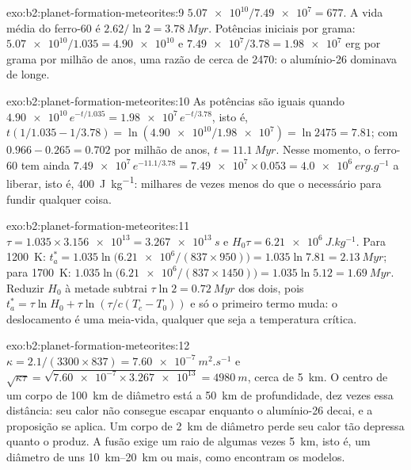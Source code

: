 \begin{solution}{exo:b2:planet-formation-meteorites:9}
$\num{5.07e10}/\num{7.49e7} = 677$. A vida média do ferro-60 é
$2.62/\ln2 = \qty{3.78}{Myr}$. Potências iniciais por grama:
$\num{5.07e10}/1.035 = \num{4.90e10}$ e $\num{7.49e7}/3.78 = \num{1.98e7}$ erg por
grama por milhão de anos, uma razão de cerca de \num{2470}: o alumínio-26 dominava de longe.
\end{solution}

\begin{solution}{exo:b2:planet-formation-meteorites:10}
As potências são iguais quando $\num{4.90e10}\,e^{-t/1.035} = \num{1.98e7}\,e^{-t/3.78}$,
isto é, $t(1/1.035 - 1/3.78) = \ln(\num{4.90e10}/\num{1.98e7}) = \ln 2475 = 7.81$;
com $0.966 - 0.265 = 0.702$ por milhão de anos, $t = \qty{11.1}{Myr}$. Nesse momento, o
ferro-60 tem ainda $\num{7.49e7}\,e^{-11.1/3.78} = \num{7.49e7}\times0.053 =
\qty{4.0e6}{erg.g^{-1}}$ a liberar, isto é, \qty{400}{J.kg^{-1}}: milhares de vezes
menos do que o necessário para fundir qualquer coisa.
\end{solution}

\begin{solution}{exo:b2:planet-formation-meteorites:11}
$\tau = 1.035\times\num{3.156e13} = \qty{3.267e13}{s}$ e
$H_0\tau = \qty{6.21e6}{J.kg^{-1}}$. Para \qty{1200}{K}:
$t_a^* = 1.035\ln\bigl(\num{6.21e6}/(837\times950)\bigr) = 1.035\ln7.81 =
\qty{2.13}{Myr}$; para \qty{1700}{K}: $1.035\ln\bigl(\num{6.21e6}/(837\times1450)\bigr)
= 1.035\ln5.12 = \qty{1.69}{Myr}$. Reduzir $H_0$ à metade subtrai $\tau\ln2 =
\qty{0.72}{Myr}$ dos dois, pois $t_a^* = \tau\ln H_0 + \tau\ln(\tau/c(T_c -
T_0))$ e só o primeiro termo muda: o deslocamento é uma meia-vida, qualquer que seja a
temperatura crítica.
\end{solution}

\begin{solution}{exo:b2:planet-formation-meteorites:12}
$\kappa = 2.1/(3300\times837) = \qty{7.60e-7}{m^2.s^{-1}}$ e
$\sqrt{\kappa\tau} = \sqrt{\num{7.60e-7}\times\num{3.267e13}} = \qty{4980}{m}$,
cerca de \qty{5}{km}. O centro de um corpo de \qty{100}{km} de diâmetro está a \qty{50}{km} de profundidade,
dez vezes essa distância: seu calor não consegue escapar enquanto o alumínio-26 decai, e a
proposição se aplica. Um corpo de \qty{2}{km} de diâmetro perde seu calor tão depressa quanto o
produz. A fusão exige um raio de algumas vezes \qty{5}{km}, isto é, um diâmetro de uns
\qtyrange{10}{20}{km} ou mais, como encontram os modelos.
\end{solution}

